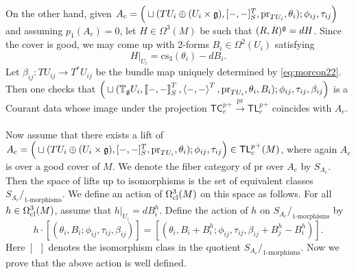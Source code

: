 \documentclass[letterpaper,10pt, oneside]{article} %
\newcommand{\tlp}{{\mathsf{TL}^{p}_{c}}} %
\newcommand{\tlpp}{{{\mathsf{TL}^{p}_{c}}}^+} %
\newcommand{\tcalgdp}{{\mathsf{TC}^{p}_{c}}} %
\newcommand{\tcalgdpp}{{\mathsf{TC}^{p}_{c}}^+} %
\newcommand{\tagui}{{\mathbb{T}_\g U_i}}
\newcommand{\cs}{\mathrm{cs}}
\def\qed{\hfill ~\vrule height6pt width6pt depth0pt}
\newcommand{\pair}[1]{\left\langle #1\right\rangle}
\newcommand{\Courant}[1]{\left\llbracket  #1\right\rrbracket }
\newcommand{\pr}{\mathrm{pr}}
\begin{document}
On the other hand, given $A_c=\Big(\sqcup (TU_i\oplus(U_i\times\g),
[-,-]^T_S,\pr_{TU_i},\theta_i);\phi_{ij},\tau_{ij}\Big) $ and assuming $p_1(A_c)=0$, let $H\in \Omega^3(M)$ be such that $(R,R)^\mathfrak g=dH$. Since the cover is good, we may come up with 2-forms $B_i\in \Omega^2(U_i)$ satisfying $$H|_{U_i}=\cs_3(\theta_i)-dB_i.$$
Let $\beta_{ij}:TU_{ij}\longrightarrow T^*U_{ij}$ be the bundle map uniquely determined by \eqref{eq:morcon22}. Then one checks that $\Big(\sqcup(\tagui, \Courant{-,-}^T_S,  \pair{-,-}^T,\pr_{TU_i},\theta_i,B_i);\phi_{ij},\tau_{ij},\beta_{ij} \Big) $ is a Courant data whose image under the projection $\tcalgdpp \xrightarrow{\pr} \tlpp$ coincides with $A_c$.
\qed\\

Now assume that there exists a lift of $A_c=\Big(\sqcup (TU_i\oplus(U_i\times\g),
[-,-]^T_S,\pr_{TU_i},\theta_i);\phi_{ij},\tau_{ij}\Big)\in\tlp^+(M)$, where again $A_c$ is over a good cover of $M$. We denote the fiber category of $\pr$ over $A_c$ by $S_{A_c}$.%
Then the space of lifts up to isomorphisms is the set of equivalent classes $S_{A_c}/_{1\mbox{-morphisms}}$.
We define an action of $\Omega^3_{\rm cl}(M)$ on this space as follows.  For all $h\in\Omega^3_{\rm cl}(M)$, assume that $h|_{U_i}=dB^h_i$. Define the action of $h$ on  $S_{A_c}/_{1\mbox{-morphisms}}$  by
\begin{equation}\label{eq:h-action}
h\cdot [ (\theta_i, B_i;\phi_{ij},\tau_{ij},\beta_{ij})] =[ ( \theta_i,
B_i+B^h_i;\phi_{ij},\tau_{ij},\beta_{ij}+B^h_j-B^h_i )].
\end{equation}
Here $[ \ \ ]$ denotes the isomorphism class in the quotient $S_{A_c}/_{1\mbox{-morphisms}}$.
Now we prove that the above action is well defined.
\end{document}
